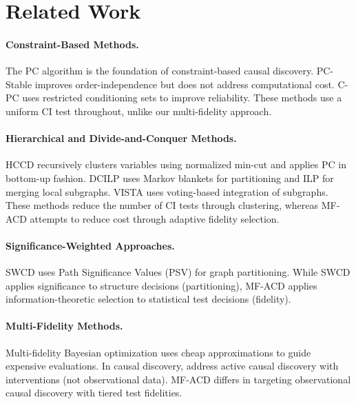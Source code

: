 \documentclass{article}
\begin{document}
\section{Related Work}

\paragraph{Constraint-Based Methods.} The PC algorithm \citep{spirtes2000causation} is the foundation of constraint-based causal discovery. PC-Stable \citep{colombo2014order} improves order-independence but does not address computational cost. C-PC \citep{lee2025constraint} uses restricted conditioning sets to improve reliability. These methods use a uniform CI test throughout, unlike our multi-fidelity approach.

\paragraph{Hierarchical and Divide-and-Conquer Methods.} HCCD \citep{shanmugam2021hccd} recursively clusters variables using normalized min-cut and applies PC in bottom-up fashion. DCILP \citep{dong2025dcilp} uses Markov blankets for partitioning and ILP for merging local subgraphs. VISTA \citep{shah2024vista} uses voting-based integration of subgraphs. These methods reduce the number of CI tests through clustering, whereas MF-ACD attempts to reduce cost through adaptive fidelity selection.

\paragraph{Significance-Weighted Approaches.} SWCD \citep{bai2025significance} uses Path Significance Values (PSV) for graph partitioning. While SWCD applies significance to structure decisions (partitioning), MF-ACD applies information-theoretic selection to statistical test decisions (fidelity).

\paragraph{Multi-Fidelity Methods.} Multi-fidelity Bayesian optimization \citep{kandasamy2016gaussian, kandasamy2017multi} uses cheap approximations to guide expensive evaluations. In causal discovery, \citet{zhang2023bayesian} address active causal discovery with interventions (not observational data). MF-ACD differs in targeting observational causal discovery with tiered test fidelities.
\end{document}
